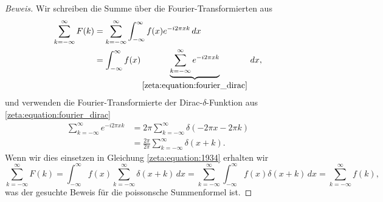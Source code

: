 \begin{proof}[Beweis]
    Wir schreiben die Summe über die Fourier-Transformierten aus
    \begin{align}
        \sum_{k=-\infty}^{\infty}
        F(k)
        &=
        \sum_{k=-\infty}^{\infty}
        \int_{-\infty}^{\infty}
        f(x)
        e^{-i 2\pi x k}
        \, dx
        \\
        &=
        \int_{-\infty}^{\infty}
        f(x)
        \underbrace{
        \sum_{k=-\infty}^{\infty}
        e^{-i 2\pi x k}
        }_{\displaystyle{\text{\eqref{zeta:equation:fourier_dirac}}}}
        \, dx, \label{zeta:equation:1934}
    \end{align}
    und verwenden die Fourier-Transformierte der Dirac-$\delta$-Funktion aus \eqref{zeta:equation:fourier_dirac}
    \begin{align}
        \sum_{k=-\infty}^{\infty}
        e^{-i 2\pi x k}
        &=
        2 \pi
        \sum_{k=-\infty}^{\infty}
        \delta(-2\pi x - 2\pi k)
        \\
        &=
        \frac{2 \pi}{2 \pi}
        \sum_{k=-\infty}^{\infty}
        \delta(x + k).
    \end{align}
    Wenn wir dies einsetzen in Gleichung \eqref{zeta:equation:1934} erhalten wir
    \begin{equation}
        \sum_{k=-\infty}^{\infty}
        F(k)
        =
        \int_{-\infty}^{\infty}
        f(x)
        \sum_{k=-\infty}^{\infty}
        \delta(x + k)
        \, dx
        =
        \sum_{k=-\infty}^{\infty}
        \int_{-\infty}^{\infty}
        f(x)
        \delta(x + k)
        \, dx
        =
        \sum_{k=-\infty}^{\infty}
        f(k),
    \end{equation}
    was der gesuchte Beweis für die poissonsche Summenformel ist.
\end{proof}

